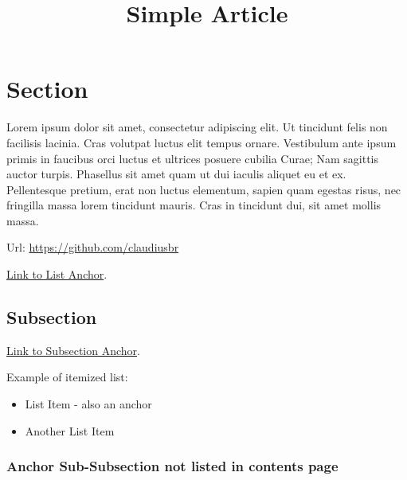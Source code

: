 \documentclass[a4paper,12pt]{article}
\title{Simple Article}
\begin{document}
\maketitle

\tableofcontents
\newpage
	
	
\section{Section}
  Lorem ipsum dolor sit amet, consectetur adipiscing elit. Ut tincidunt felis
  non facilisis lacinia. Cras volutpat luctus elit tempus ornare. Vestibulum
  ante ipsum primis in faucibus orci luctus et ultrices posuere cubilia Curae;
  Nam sagittis auctor turpis. Phasellus sit amet quam ut dui iaculis aliquet eu
  et ex. Pellentesque pretium, erat non luctus elementum, sapien quam egestas
  risus, nec fringilla massa lorem tincidunt mauris. Cras in tincidunt dui, sit
  amet mollis massa.

  Url: \url{https://github.com/claudiusbr}

  \hyperref[sec:Step2]{Link to List Anchor}.

	
\subsection{Subsection}

  
  \hyperlink{LinkToSubsection}{Link to Subsection Anchor}.
  
  Example of itemized list:
  \begin{itemize}
          \label{sec:Step2}
          \item
            List Item - also an anchor
          \item
            Another List Item
  \end{itemize}	
	

\hypertarget{LinkToSubsection}{
	\subsubsection*{Anchor Sub-Subsection not listed in contents page}
}
\end{document}
